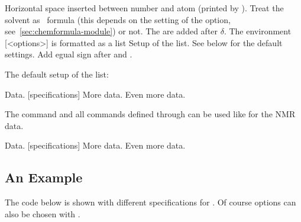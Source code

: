 \documentclass{chemmacros-manual}
\begin{document}
\begin{options}
  \Default{.16667em}
    Horizontal space inserted between number and atom
    (printed by \cs{\#}).
    Treat the solvent as \chemformula\ formula (this depends on the setting of
    the  option, see~\vref{sec:chemformula-module}) or not.
  \Default
    The  are added after $\delta$.
    The environment [<options>]{} is formatted as a list
    Setup of the list. See below for the default settings.
    Add egual sign after  and .
\end{options}

The default setup of the list:
\begin{sourcecode}
  \topsep\z@skip \partopsep\z@skip 
  \itemsep\z@ \parsep\z@ \itemindent\z@
  \leftmargin\z@
\end{sourcecode}

\begin{example}
  \begin{experimental}[format=\bfseries]
     Data.
    [specifications] More data.
     Even more data.
  \end{experimental}
\end{example}

The command  and all commands defined through 
can be used like  for the NMR data.

\begin{example}
  \begin{experimental}[format=\bfseries,use-equal]
     Data.
    [specifications] More data.
    \NMR Even more data.
  \end{experimental}
\end{example}

\subsection{An Example}
The code below is shown with different specifications for .
Of course options can also be chosen with .
\end{document}
